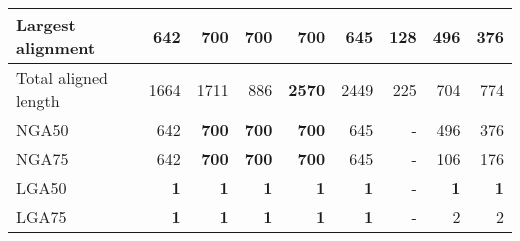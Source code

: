 \documentclass[12pt,a4paper]{article}
\begin{document}
\begin{table}[ht]
\begin{center}
\begin{tabular}{|l*{8}{|r}|}
Largest alignment & 642 & {\bf 700} & {\bf 700} & {\bf 700} & 645 & 128 & 496 & 376 \\ \hline
Total aligned length & 1664 & 1711 & 886 & {\bf 2570} & 2449 & 225 & 704 & 774 \\ \hline
NGA50 & 642 & {\bf 700} & {\bf 700} & {\bf 700} & 645 & - & 496 & 376 \\ \hline
NGA75 & 642 & {\bf 700} & {\bf 700} & {\bf 700} & 645 & - & 106 & 176 \\ \hline
LGA50 & {\bf 1} & {\bf 1} & {\bf 1} & {\bf 1} & {\bf 1} & - & {\bf 1} & {\bf 1} \\ \hline
LGA75 & {\bf 1} & {\bf 1} & {\bf 1} & {\bf 1} & {\bf 1} & - & 2 & 2 \\ \hline
\end{tabular}
\end{center}
\end{table}
\end{document}
